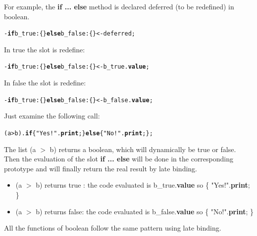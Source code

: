 \documentclass[11pt]{mybook}
\begin{document}
For example, the {\bf{}if ... else} method is declared deferred (to be redefined) in {\sc{}boolean}.
\begin{alltt}
  - {\bf{}if} b_true:{\sc{}\{ \}} {\bf{}else} b_false:{\sc{}\{ \}} <- deferred;
\end{alltt}
In {\sc{}true} the slot is redefine:
\begin{alltt}
  - {\bf{}if} b_true:{\sc{}\{ \}} {\bf{}else} b_false:{\sc{}\{ \}} <- b_true.{\bf{}value};
\end{alltt}
In {\sc{}false} the slot is redefine:
\begin{alltt}
  - {\bf{}if} b_true:{\sc{}\{ \}} {\bf{}else} b_false:{\sc{}\{ \}} <- b_false.{\bf{}value};
\end{alltt}

Just examine the following call:
\begin{alltt}
  (a > b).{\bf{}if} \{ "Yes!".{\bf{}print}; \} {\bf{}else} \{ "No!".{\bf{}print}; \};
\end{alltt}
The list (a $>$ b) returns a boolean, which will dynamically be {\sc{}true} or {\sc{}false}.
Then the evaluation of the slot {\bf{}if ... else} will be done in the corresponding prototype and will finally return the real result by late binding.\\
\begin{itemize}
\item{(a $>$ b) returns {\sc{}true} : the code evaluated is b\_true.{\bf{}value} so \{ "Yes!".{\bf{}print}; \}}
\item{(a $>$ b) returns {\sc{}false}: the code evaluated is b\_false.{\bf{}value} so \{ "No!".{\bf{}print}; \}}
\end{itemize}
All the functions of {\sc{}boolean} follow the same pattern using late binding.
\end{document}
